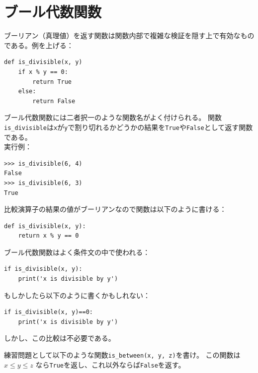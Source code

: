 \documentclass[a4j,12pt,makeidx]{jbook}
\begin{document}
\section{ブール代数関数}
ブーリアン（真理値）を返す関数は関数内部で複雑な検証を隠す上で有効なものである。例を上げる：
\begin{verbatim}
def is_divisible(x, y)
    if x % y == 0:
        return True
    else:
        return False
\end{verbatim}
ブール代数関数には二者択一のような関数名がよく付けられる。
関数{\tt is\_divisible}は{\tt x}が{\tt y}で割り切れるかどうかの結果を{\tt True}や{\tt False}として返す関数である。\\
実行例：
\begin{verbatim}
>>> is_divisible(6, 4)
False
>>> is_divisible(6, 3)
True
\end{verbatim} \par
比較演算子の結果の値がブーリアンなので関数は以下のように書ける：
\begin{verbatim}
def is_divisible(x, y):
    return x % y == 0
\end{verbatim} \par
ブール代数関数はよく条件文の中で使われる：
\begin{verbatim}
if is_divisible(x, y):
    print('x is divisible by y')
\end{verbatim}
もしかしたら以下のように書くかもしれない：
\begin{verbatim}
if is_divisible(x, y)==0:
    print('x is divisible by y')
\end{verbatim}
しかし、この比較は不必要である。\par
練習問題として以下のような関数{\tt is\_between(x, y, z)}を書け。
この関数は$x \le y \le z$ なら{\tt True}を返し、これ以外ならば{\tt False}を返す。
%
\end{document}
